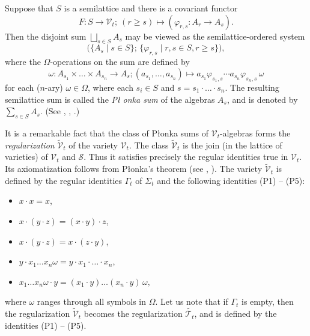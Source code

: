 \documentclass{birkau}
\def\Om{\Omega}
\newcommand{\mcV}{\mathcal{V}}
\newcommand{\mcT}{\mathcal{T}}
\newcommand{\mcS}{\mathcal{S}}
\def\tV{\widetilde{\mcV}}
\def\tT{\widetilde{\mcT_t}}
\theoremstyle{plain}
\theoremstyle{definition}
\numberwithin{equation}{section}
\begin{document}
Suppose that $S$ is a semilattice and there is a covariant functor
\begin{equation*}
F\colon S  \rightarrow \mcV_t;\  (r \geq s) \mapsto (\varphi_{r,s}\colon A_r \rightarrow A_s).
\end{equation*}
Then the disjoint sum $\bigsqcup_{s \in S} A_s$ may be viewed as the semilattice-ordered system
\begin{equation}\label{eq:1}
\bigl(\{A_s \mid s\in  S\};\, \{\varphi_{r,s}\mid  r,s \in S, r \geq s\}\bigr),
\end{equation}
where the $\Om$-operations on the sum are defined by
\begin{equation*}
\omega\colon A_{s_1} \times \dots \times A_{s_n} \rightarrow A_s ; (a_{s_1}, \dots, a_{s_n})
\mapsto a_{s_1}\varphi_{s_1,s} \dotsm a_{s_n}\varphi_{s_n,s}\, \omega
\end{equation*}
for each ($n$-ary) $\omega \in \Om$, where each $s_i \in S$ and
$s = s_1\cdot \dots \cdot s_n$.  The resulting semilattice sum is called the \emph{P\l
  onka sum} of the algebras $A_s$, and is denoted by $\sum_{s\in S} A_s$. (See \cite{P67},
\cite{PR92}, \cite[Ch.~4]{RS02} .)

It is a remarkable fact that the class of P\l onka sums of $\mcV_t$-algebras forms the
\emph{regularization} $\tV_t$ of the variety $\mcV_t$. The class $\tV_t$ is the join (in
the lattice of varieties) of $\mcV_t$ and $\mcS$. Thus it satisfies precisely the regular
identities true in $\mcV_t$.  Its axiomatization follows from P\l onka's theorem (see
\cite{PR92}, \cite[Ch.~4]{RS02}). The variety $\tV_t$ is defined by the regular identities
$\Gamma_t$ of $\Sigma_t$ and the following identities (P1) -- (P5): 
\begin{itemize}
\item[(P1)] $x \cdot x = x$,
\item[(P2)] $x \cdot (y\cdot z) = (x\cdot y) \cdot z$,
\item[(P3)] $x \cdot (y\cdot z) = x \cdot (z\cdot y)$,
\item[(P4)] $y \cdot x_1 \dots x_n \omega = y \cdot x_1 \cdot \dots \cdot x_n$,
\item[(P5)] $x_1 \dots x_n \omega \cdot y = (x_1 \cdot y ) \dots (x_n \cdot y)\, \omega,$
\end{itemize}
where $\omega$ ranges through all symbols in $\Om$.  Let us note that if $\Gamma_t$ is
empty, then the regularization $\tV_t$ becomes the regularization $\tT$, and is defined by
the identities (P1) -- (P5).
\end{document}

